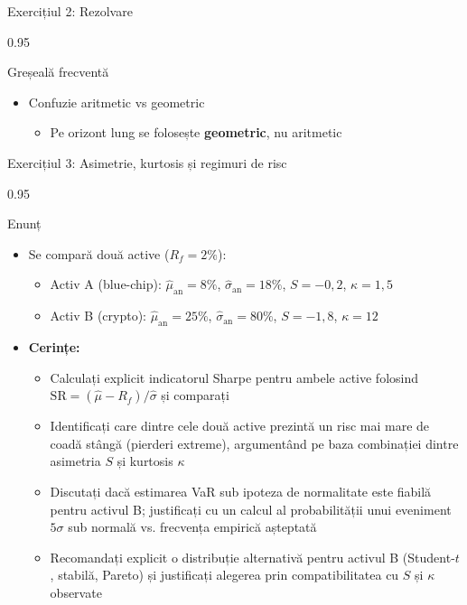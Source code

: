 \documentclass[9pt, aspectratio=169, t]{beamer}
\begin{document}
\begin{frame}[shrink=25]{Exercițiul 2: Rezolvare}
\begin{cminipage}{0.95\textwidth}
\begin{alertblock}{Greșeală frecventă}
\begin{itemize}\setlength{\itemsep}{0pt}
    \item Confuzie aritmetic vs geometric
    \begin{itemize}\setlength{\itemsep}{0pt}
        \item Pe orizont lung se folosește \textbf{geometric}, nu aritmetic
    \end{itemize}
\end{itemize}
\end{alertblock}
\end{cminipage}
\end{frame}

\begin{frame}[shrink=25]{Exercițiul 3: Asimetrie, kurtosis și regimuri de risc}
\begin{cminipage}{0.95\textwidth}
\begin{block}{Enunț}
\begin{itemize}\setlength{\itemsep}{0pt}
    \item Se compară două active ($R_f = 2\%$):
    \begin{itemize}\setlength{\itemsep}{0pt}
        \item Activ A (blue-chip): $\hat\mu_{\text{an}} = 8\%$, $\hat\sigma_{\text{an}} = 18\%$, $S = -0{,}2$, $\kappa = 1{,}5$
        \item Activ B (crypto): $\hat\mu_{\text{an}} = 25\%$, $\hat\sigma_{\text{an}} = 80\%$, $S = -1{,}8$, $\kappa = 12$
    \end{itemize}
    \item \textbf{Cerințe:}
    \begin{itemize}\setlength{\itemsep}{0pt}
        \item Calculați explicit indicatorul Sharpe pentru ambele active folosind $\text{SR} = (\hat\mu - R_f)/\hat\sigma$ și comparați
        \item Identificați care dintre cele două active prezintă un risc mai mare de coadă stângă (pierderi extreme), argumentând pe baza combinației dintre asimetria $S$ și kurtosis $\kappa$
        \item Discutați dacă estimarea VaR sub ipoteza de normalitate este fiabilă pentru activul B; justificați cu un calcul al probabilității unui eveniment $5\sigma$ sub normală vs. frecvența empirică așteptată
        \item Recomandați explicit o distribuție alternativă pentru activul B (Student-$t$, stabilă, Pareto) și justificați alegerea prin compatibilitatea cu $S$ și $\kappa$ observate
    \end{itemize}
\end{itemize}
\end{block}
\end{cminipage}
\end{frame}
\end{document}
